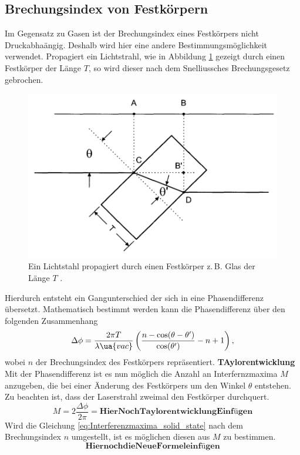 \subsection{Brechungsindex von Festkörpern}
Im Gegensatz zu Gasen ist der Brechungsindex eines Festkörpers nicht Druckabhaängig.
Deshalb wird hier eine andere Bestimmungsmöglichkeit verwendet.
Propagiert ein Lichtstrahl, wie in Abbildung \ref{fig:slag} gezeigt durch einen Festkörper der Länge $T$,
so wird dieser nach dem Snelliussches Brechungsgesetz gebrochen.
\begin{figure}
\centering
\includegraphics[width=0.7\linewidth]{./content/images/slab.png}
\caption{Ein Lichtstahl propagiert durch einen Festkörper z.\,B. Glas der Länge $T$ \cite{anleitung64}.}
\label{fig:slag}
\end{figure}
Hierdurch entsteht ein Gangunterschied der sich in eine Phasendifferenz übersetzt.
Mathematisch bestimmt werden kann die Phasendifferenz über den folgenden Zusammenhang
\begin{equation}
  \label{eq:Phasendifferenz_festkörper}
  \Delta\phi=\frac{ 2\pi T }{ \lambda\ua{vac} }\left( \frac{ n-\cos(\theta-\theta') }{ \cos(\theta') } - n+1\right),
\end{equation}
wobei $n$ der Brechungsindex des Festkörpers repräsentiert.
\textbf{TAylorentwicklung}
Mit der Phasendifferenz ist es nun möglich die Anzahl an Interfernzmaxima $M$ anzugeben, die bei einer Änderung
des Festkörpers um den Winkel $\theta$ entstehen. Zu beachten ist, dass der Laserstrahl zweimal den Festkörper
durchquert.
\begin{equation}
  \label{eq:Interferenzmaxima_solid_state}
  M=2\frac{\Delta\phi}{2\pi}=\textbf{HierNochTaylorentwicklungEinfügen}
\end{equation}
Wird die Gleichung \eqref{eq:Interferenzmaxima_solid_state} nach dem Brechungsindex $n$
umgestellt, ist es möglichen diesen aus $M$ zu bestimmen.
\begin{equation}
  \textbf{HiernochdieNeueFormeleinfügen}
\end{equation}

